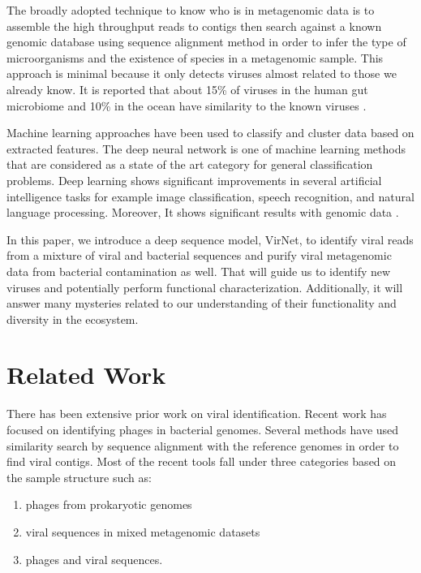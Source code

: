 \documentclass[conference]{IEEEtran}
\begin{document}
The broadly adopted technique to know who is in metagenomic data is to assemble the high throughput reads to contigs then search against a known genomic database using sequence alignment method in order to infer the type of microorganisms and the existence of species in a metagenomic sample. This approach is minimal because it only detects viruses almost related to those we already know. It is reported that about 15\% of viruses in the human gut microbiome and 10\% in the ocean have similarity to the known viruses \cite{ren2017virfinder}. 

Machine learning approaches have been used to classify and cluster data based on extracted features. The deep neural network is one of machine learning methods that are considered as a state of the art category for general classification problems. Deep learning shows significant improvements in several artificial intelligence tasks for example image classification, speech recognition, and natural language processing. Moreover, It shows significant results with genomic data \cite{angermueller2016deep}. %

In this paper, we introduce a deep sequence model, VirNet, to identify viral reads from a mixture of viral and bacterial sequences and purify viral metagenomic data from bacterial contamination as well. That will guide us to identify new viruses and potentially perform functional characterization. Additionally, it will answer many mysteries related to our understanding of their functionality and diversity in the ecosystem.

\section{Related Work}

There has been extensive prior work on viral identification. Recent work has focused on identifying phages in bacterial genomes. Several methods have used similarity search by sequence alignment with the reference genomes in order to find viral contigs. Most of the recent tools fall under three categories based on the sample structure such as:
\begin{enumerate}
	\item phages from prokaryotic genomes
	\item viral sequences in mixed metagenomic datasets
	\item phages and viral sequences. 
\end{enumerate} 
\end{document}

